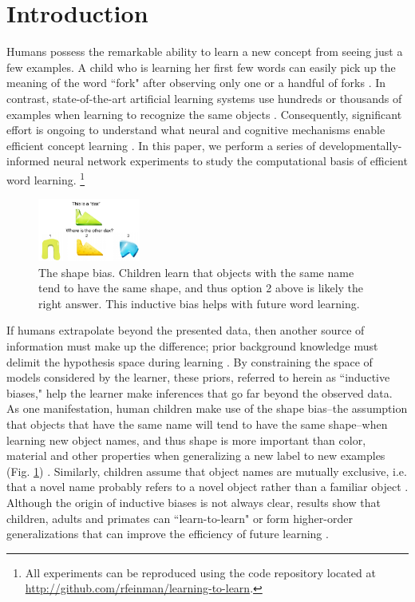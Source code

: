 \section{Introduction}

Humans possess the remarkable ability to learn a new concept from seeing just a
few examples. A child who is learning her first few words can easily pick up
the meaning of the word ``fork" after observing only one or a handful of forks
\citep{Bloom2000}. In contrast, state-of-the-art artificial learning systems use
hundreds or thousands of examples when learning to recognize the same objects
\citep[e.g.,][]{Krizhevsky2012, Szegedy2015}. Consequently, significant
effort is ongoing to understand what neural and cognitive mechanisms enable
efficient concept learning \citep{Lake2017}. In this paper, we perform a series
of developmentally-informed neural network experiments to study the
computational basis of efficient word learning. \footnote{All experiments can be
reproduced using the code repository located at
\url{http://github.com/rfeinman/learning-to-learn}.}

\begin{figure}[h!]
    \begin{center}
        \includegraphics[width=0.3\textwidth]{figures/shape_bias_demo.pdf}
    \end{center}
    \caption{The shape bias. Children learn that objects with the same name
    tend to have the same shape, and thus option 2 above is likely the right
    answer. This inductive bias helps with future word learning.}
    \label{fig:shape_bias_demo}
\end{figure}

If humans extrapolate beyond the presented data, then another source of
information must make up the difference; prior background knowledge must
delimit the hypothesis space during learning \citep{Tenenbaum2011, Lake2017}. By
constraining the space of models considered by the learner, these priors,
referred to herein as ``inductive biases," help the learner make inferences
that go far beyond the observed data. As one manifestation, human children make
use of the shape bias--the assumption that objects that have the same name will
tend to have the same shape--when learning new object names, and thus shape is
more important than color, material and other properties when generalizing a
new label to new examples (Fig. \ref{fig:shape_bias_demo}) \citep{Landau1988}.
Similarly, children assume that object names are mutually exclusive, i.e. that
a novel name probably refers to a novel object rather than a familiar object
\citep{Markman1988}. Although the origin of inductive biases is not always
clear, results show that children, adults and primates can ``learn-to-learn" or
form higher-order generalizations that can improve the efficiency of future
learning \citep{Harlow1949, Smith2002, Dewar2010}.

